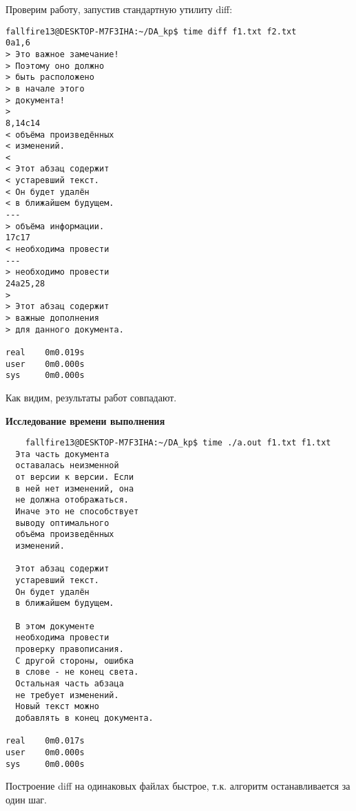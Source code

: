 Проверим работу, запустив стандартную утилиту diff:

\begin{verbatim}
fallfire13@DESKTOP-M7F3IHA:~/DA_kp$ time diff f1.txt f2.txt
0a1,6
> Это важное замечание!
> Поэтому оно должно
> быть расположено
> в начале этого
> документа!
>
8,14c14
< объёма произведённых
< изменений.
<
< Этот абзац содержит
< устаревший текст.
< Он будет удалён
< в ближайшем будущем.
---
> объёма информации.
17c17
< необходима провести
---
> необходимо провести
24a25,28
>
> Этот абзац содержит
> важные дополнения
> для данного документа.

real    0m0.019s
user    0m0.000s
sys     0m0.000s
\end{verbatim}

Как видим, результаты работ совпадают.

\textbf{Исследование времени выполнения}

\begin{verbatim}
    fallfire13@DESKTOP-M7F3IHA:~/DA_kp$ time ./a.out f1.txt f1.txt
  Эта часть документа
  оставалась неизменной
  от версии к версии. Если
  в ней нет изменений, она
  не должна отображаться.
  Иначе это не способствует
  выводу оптимального
  объёма произведённых
  изменений.

  Этот абзац содержит
  устаревший текст.
  Он будет удалён
  в ближайшем будущем.

  В этом документе
  необходима провести
  проверку правописания.
  С другой стороны, ошибка
  в слове - не конец света.
  Остальная часть абзаца
  не требует изменений.
  Новый текст можно
  добавлять в конец документа.

real    0m0.017s
user    0m0.000s
sys     0m0.000s
\end{verbatim}
Построение diff на одинаковых файлах быстрое, т.к. алгоритм останавливается за один шаг.

